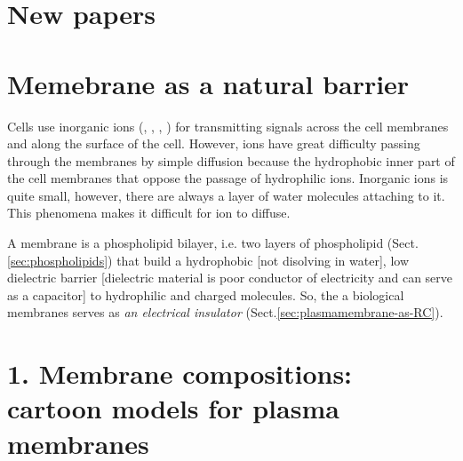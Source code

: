 \section{New papers}

\citep{kusumi1996, kusumi2005}


\section{Memebrane as a natural barrier}
\label{sec:membrane-natural-barrier}

Cells use inorganic ions (, , , ) for
transmitting signals across the cell membranes and along the surface
of the cell. However, ions have great difficulty passing through the
membranes by simple diffusion because the hydrophobic inner part of
the cell membranes that oppose the passage of hydrophilic
ions. Inorganic ions is quite small, however, there are always a layer
of water molecules attaching to it. This phenomena makes it difficult
for ion to diffuse.

A membrane is a phospholipid bilayer, i.e. two layers of phospholipid
(Sect.\ref{sec:phospholipids}) that build a hydrophobic [not disolving in
water], low dielectric barrier [dielectric material is poor conductor of
electricity and can serve as a capacitor] to hydrophilic and charged molecules.
So, the a biological membranes serves as {\it an electrical insulator}
(Sect.\ref{sec:plasmamembrane-as-RC}).

\section{1. Membrane compositions: cartoon models for plasma membranes}
\label{sec:models-membranes}
\label{sec:models-biomembrane}

